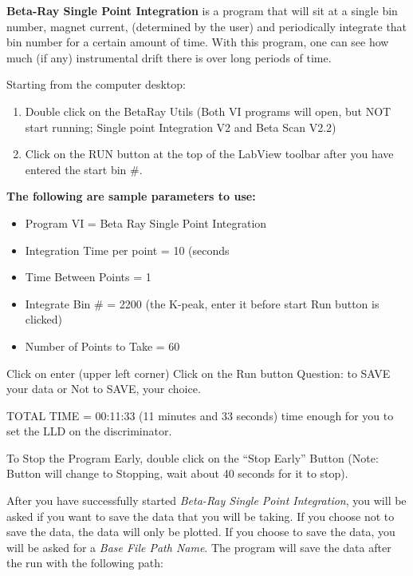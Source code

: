 \documentclass{../lab}
\begin{document}
\textbf{Beta-Ray Single Point Integration} is a program that will sit at a single bin number, magnet current, (determined by the user) and periodically integrate that bin number for a certain amount of time. With this program, one can see how much (if any) instrumental drift there is over long periods of time.

Starting from the computer desktop:

\begin{enumerate}
    \item Double click on the BetaRay Utils (Both VI programs will open, but NOT start running; Single point Integration V2 and Beta Scan V2.2)

    \item Click on the RUN button at the top of the LabView toolbar after you have entered the start bin \#.

\end{enumerate}

\textbf{The following are sample parameters to use:}

\begin{itemize}
    \item Program VI = Beta Ray Single Point Integration

    \item Integration Time per point = 10 (seconds

    \item Time Between Points = 1

    \item Integrate Bin \# = 2200 (the K-peak, enter it before start Run button is clicked)

    \item Number of Points to Take = 60
\end{itemize}

Click on enter (upper left corner) Click on the Run button Question: to SAVE your data or Not to SAVE, your choice.

TOTAL TIME = 00:11:33 (11 minutes and 33 seconds) time enough for you to set the LLD on the discriminator.

To Stop the Program Early, double click on the ``Stop Early'' Button (Note: Button will change to Stopping, wait about 40 seconds for it to stop).

After you have successfully started \emph{Beta-Ray Single Point Integration}, you will be asked if you want to save the data that you will be taking. If you choose not to save the data, the data will only be plotted. If you choose to save the data, you will be asked for a \emph{Base File Path Name}. The program will save the data after the run with the following path:
\end{document}
